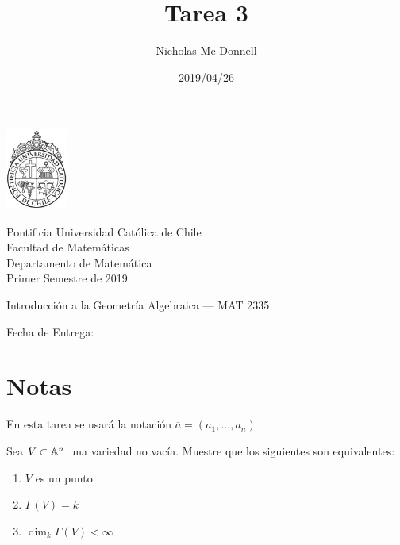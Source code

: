

\title{Tarea 3}
\author{Nicholas Mc-Donnell}
\date{2019/04/26}



\begin{minipage}{2.5cm}
    \includegraphics[width=2cm]{../../figures/logo1.jpg}
\end{minipage}
\begin{minipage}{13cm}
    \begin{flushleft}
        \raggedright{
            \noindent
            {\sc Pontificia Universidad Católica de Chile\\
                Facultad de Matemáticas\\
                Departamento de Matemática} \smallskip \\
            Primer Semestre de 2019\\
        }
    \end{flushleft}
\end{minipage}

\vspace{2ex}
{\Large \centerline{\bf \thetitle}}
{\large \centerline{Introducción a la Geometría Algebraica --- MAT 2335}}
{\normalsize \centerline{ Fecha de Entrega: \thedate}}
\vfill

\begin{flushright}
    {\large\theauthor}
\end{flushright}
\newpage
\normalsize
{}
\tableofcontents
\newpage

\section*{Notas}
En esta tarea se usará la notación \(\overline{a}=(a_1,\dots ,a_n)\)\\

\begin{prob}{2.4}
    Sea \(V\subset\mathbb{A}^n\) una variedad no vacía. Muestre que los siguientes son equivalentes:
    \begin{enumerate}[label=(\roman*)]
        \item \(V\) es un punto
        \item \(\Gamma(V)=k\)
        \item \(\dim_k\Gamma(V)<\infty\)
    \end{enumerate}
\end{prob}

